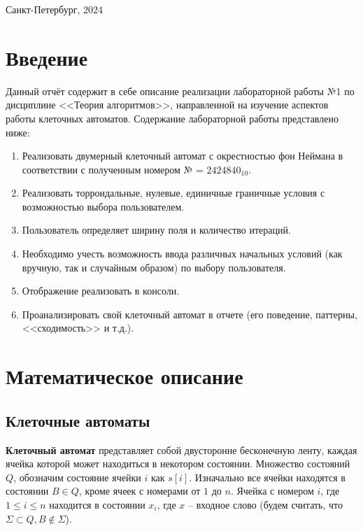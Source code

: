 \documentclass[a4paper, final]{article}
\begin{document}
\hfill \break
\hfill \break
\hfill \break
\hfill \break
\hfill \break
\begin{center} \small{Санкт-Петербург, 2024} \end{center}
\thispagestyle{empty} %

\newpage

\tableofcontents

\newpage

\cleardoublepage
{}
{}
\section*{Введение}
Данный отчёт содержит в себе описание реализации лабораторной работы №1 по дисциплине <<Теория
алгоритмов>>, направленной на изучение аспектов работы клеточных автоматов. Содержание лабораторной
работы представлено ниже:
\begin{enumerate}
  \item Реализовать двумерный клеточный автомат с окрестностью фон Неймана в соответствии с 
  полученным номером № = $2424840_{10}$.
  \item Реализовать торроидальные, нулевые, единичные граничные условия с возможностью выбора пользователем.
  \item Пользователь определяет ширину поля и количество итераций. 
  \item Необходимо учесть возможность ввода различных начальных условий (как вручную, так и 
  случайным образом) по выбору пользователя. 
  \item Отображение реализовать в консоли.
  \item Проанализировать свой клеточный автомат в отчете (его поведение, паттерны, <<сходимость>> 
  и т.д.). 
\end{enumerate}

\newpage
\section{Математическое описание}
\subsection{Клеточные автоматы}
\textbf{Клеточный автомат} представляет собой двусторонне бесконечную ленту, каждая ячейка 
которой может находиться в некотором состоянии. Множество состояний $Q$, обозначим состояние ячейки $i$ 
как $s[i]$. Изначально все ячейки находятся в состоянии $B \in Q$, кроме ячеек с номерами от $1$ до $n$. 
Ячейка с номером $i$, где $1 \leq i \leq n$ находится в состоянии $x_i$, где $x$ -- входное слово
(будем считать, что $\Sigma \subset Q, B \not \in \Sigma$).
\end{document}

